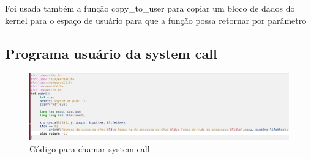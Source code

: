 \documentclass[12pt]{article}
\begin{document}
	Foi usada também a função copy\_to\_user para copiar um bloco de dados do kernel para o espaço de usuário para que a função possa retornar por parâmetro
 \pagebreak
\subsection*{Programa usuário da system call}
\begin{figure}[!htb]
\includegraphics[scale=0.37]{imagens/cod.png} 
	\caption{Código para chamar system call}
\end{figure}
 \pagebreak



\end{document}
